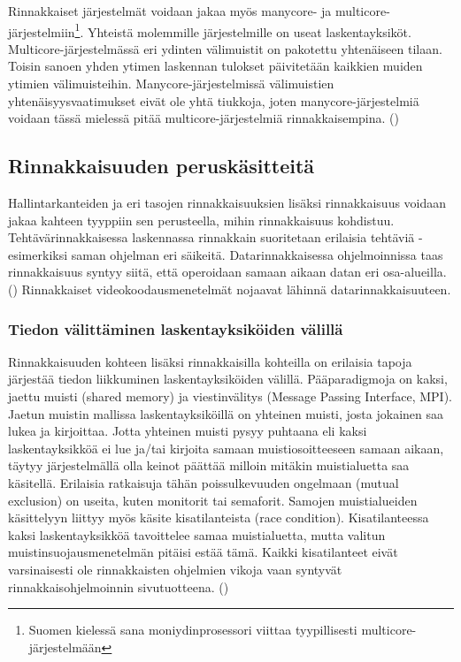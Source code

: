 Rinnakkaiset järjestelmät voidaan jakaa myös manycore- ja
multicore-järjestelmiin\footnote{Suomen kielessä sana moniydinprosessori
viittaa tyypillisesti multicore-järjestelmään}. Yhteistä molemmille
järjestelmille on useat laskentayksiköt. Multicore-järjestelmässä eri
ydinten välimuistit on pakotettu yhtenäiseen tilaan. Toisin sanoen yhden
ytimen laskennan tulokset päivitetään kaikkien muiden ytimien välimuisteihin.
Manycore-järjestelmissä välimuistien yhtenäisyysvaatimukset eivät ole yhtä
tiukkoja, joten manycore-järjestelmiä voidaan tässä mielessä pitää
multicore-järjestelmiä rinnakkaisempina. (\citealt{vajda})

\subsection{Rinnakkaisuuden peruskäsitteitä}

Hallintarkanteiden ja eri tasojen rinnakkaisuuksien lisäksi rinnakkaisuus voidaan jakaa
kahteen tyyppiin sen perusteella, mihin rinnakkaisuus kohdistuu.
Tehtävärinnakkaisessa laskennassa rinnakkain suoritetaan erilaisia
tehtäviä - esimerkiksi saman ohjelman eri säikeitä. Datarinnakkaisessa
ohjelmoinnissa taas rinnakkaisuus syntyy siitä, että operoidaan samaan aikaan
datan eri osa-alueilla. (\citealt{intro}) Rinnakkaiset videokoodausmenetelmät
nojaavat lähinnä datarinnakkaisuuteen.

\subsubsection{Tiedon välittäminen laskentayksiköiden välillä}

Rinnakkaisuuden kohteen lisäksi rinnakkaisilla kohteilla on erilaisia tapoja
järjestää tiedon liikkuminen laskentayksiköiden välillä. Pääparadigmoja on
kaksi, jaettu muisti (shared memory) ja viestinvälitys (Message Passing Interface, MPI). Jaetun muistin mallissa
laskentayksiköillä on yhteinen muisti, josta jokainen saa lukea ja kirjoittaa.
Jotta yhteinen muisti pysyy puhtaana eli kaksi laskentayksikköä ei lue ja/tai
kirjoita samaan muistiosoitteeseen samaan aikaan, täytyy järjestelmällä
olla keinot päättää milloin mitäkin muistialuetta saa käsitellä.
Erilaisia ratkaisuja tähän poissulkevuuden ongelmaan (mutual exclusion) on useita, kuten
monitorit tai semaforit. Samojen muistialueiden käsittelyyn
liittyy myös käsite kisatilanteista (race condition). Kisatilanteessa kaksi
laskentayksikköä tavoittelee samaa muistialuetta, mutta valitun
muistinsuojausmenetelmän pitäisi estää tämä. Kaikki kisatilanteet eivät varsinaisesti
ole rinnakkaisten ohjelmien vikoja vaan syntyvät rinnakkaisohjelmoinnin
sivutuotteena. (\citealt{ari})


